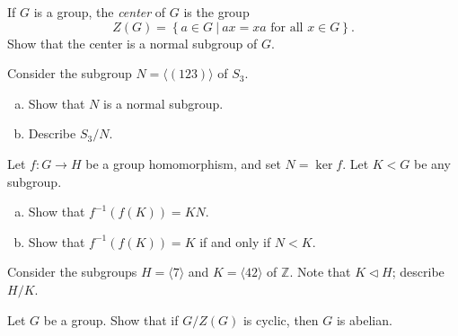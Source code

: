 \documentclass{problemset}
\begin{document}
\begin{exercise} If \(G\) is a group, the {\em center} of \(G\) is the group
 \[Z(G) = \left\{ a \in G\ |\ ax=xa \text{ for all } x\in G\right\}.\]
Show that the center is a normal subgroup of \(G\).
\end{exercise}


\begin{exercise}Consider the subgroup \(N=\langle (123)\rangle\) of \(S_3\).
\begin{enumerate}[(a)]
\item Show that \(N\) is a normal subgroup.
\item Describe \(S_3/N\).
\end{enumerate}
\end{exercise}



\begin{exercise}Let \(f: G \rightarrow H\) be a group homomorphism, and set \(N=\ker f\).  Let \(K<G\) be any subgroup.
\begin{enumerate}[(a)]
\item Show that \(f^{-1}\left(f(K)\right)=KN\).
\item Show that \(f^{-1}\left(f(K)\right)=K\) if and only if \(N < K\).
\end{enumerate}
\end{exercise}


\begin{exercise}
Consider the subgroups \(H=\langle 7\rangle\) and \(K=\langle 42\rangle\) of \(\mathbb{Z}\).  Note that \(K \lhd H\);  describe \(H/K\). 
\end{exercise}


\begin{exercise} Let \(G\) be a group. Show that if \(G/Z(G)\) is cyclic, then \(G\) is abelian.
\end{exercise}






\end{document}
